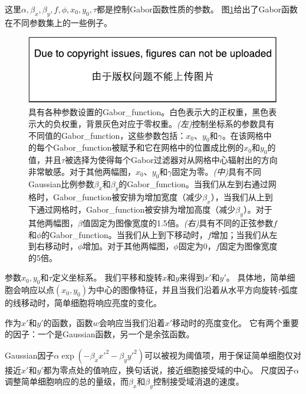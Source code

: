 这里$\alpha, \beta_x, \beta_y, f, \phi, x_0, y_0, \tau$都是控制Gabor函数性质的参数。
图\ref{fig:chap9_Gabor_functions}给出了Gabor函数在不同参数集上的一些例子。
\begin{figure}
\ifOpenSource
\centerline{\includegraphics{figure.pdf}}
\else
\centering    
{}     
\fi
\captionsetup{singlelinecheck=off}
\caption{具有各种参数设置的\gls{Gabor_function}。白色表示大的正权重，黑色表示大的负权重，背景灰色对应于零权重。\emph{(左)}控制坐标系的参数具有不同值的\gls{Gabor_function}，这些参数包括：$x_0$、$y_0$和$\gamma$。在该网格中的每个\gls{Gabor_function}被赋予和它在网格中的位置成比例的$x_0$和$y_0$的值，并且$\tau$被选择为使得每个Gabor过滤器对从网格中心辐射出的方向非常敏感。对于其他两幅图，$x_0$、$y_0$和$\gamma$固定为零。\emph{(中)}具有不同Gaussian比例参数$\beta_x$和$\beta_y$的\gls{Gabor_function}。当我们从左到右通过网格时，\gls{Gabor_function}被安排为增加宽度（减少$\beta_x$），当我们从上到下通过网格时，\gls{Gabor_function}被安排为增加高度（减少$\beta_y$）。对于其他两幅图，$\beta$值固定为图像宽度的1.5倍。\emph{(右)}具有不同的正弦参数$f$和$\phi$的\gls{Gabor_function}。当我们从上到下移动时，$f$增加；当我们从左到右移动时，$\phi$增加。对于其他两幅图，$\phi$固定为0，$f$固定为图像宽度的5倍。}     
\label{fig:chap9_Gabor_functions}     
\end{figure}

参数$x_0,y_0$和$\tau$定义坐标系。
我们平移和旋转$x$和$y$来得到$x'$和$y'$。
具体地，简单细胞会响应以点$(x_0, y_0)$为中心的图像特征，并且当我们沿着从水平方向旋转$\tau$弧度的线移动时，简单细胞将响应亮度的变化。
 
 
作为$x'$和$y'$的函数，函数$w$会响应当我们沿着$x'$移动时的亮度变化。
它有两个重要的因子：一个是Gaussian函数，另一个是余弦函数。

Gaussian因子$ \alpha \exp(-\beta_x x'^2 - \beta_y y'^2)$可以被视为阈值项，用于保证简单细胞仅对接近$x'$和$y'$都为零点处的值响应，换句话说，接近细胞接受域的中心。
尺度因子$\alpha$调整简单细胞响应的总的量级，而$\beta_x$和$\beta_y$控制接受域消退的速度。


